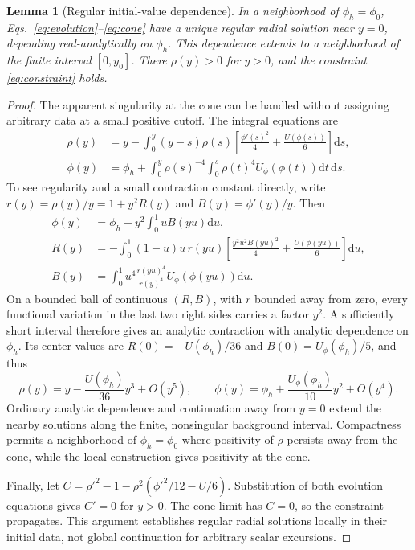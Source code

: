 \documentclass[11pt]{article}
\newtheorem{lemma}{Lemma}
\newcommand{\dd}{\mathrm{d}}
\begin{document}
\begin{lemma}[Regular initial-value dependence]\label{lem:ivp}
In a neighborhood of $\phi_h=\phi_0$, Eqs.~\eqref{eq:evolution}--\eqref{eq:cone} have a unique regular radial solution near $y=0$, depending real-analytically on $\phi_h$. This dependence extends to a neighborhood of the finite interval $[0,y_0]$. There $\rho(y)>0$ for $y>0$, and the constraint \eqref{eq:constraint} holds.
\end{lemma}
\begin{proof}
The apparent singularity at the cone can be handled without assigning arbitrary data at a small positive cutoff. The integral equations are
\begin{align}
\rho(y)&=y-\int_0^y(y-s)\rho(s)
 \left[\frac{\phi'(s)^2}{4}+\frac{U(\phi(s))}{6}\right]\dd s,\label{eq:volterra1}\\
\phi(y)&=\phi_h+\int_0^y\rho(s)^{-4}
 \int_0^s\rho(t)^4U_\phi(\phi(t))\dd t\,\dd s.
\label{eq:volterra2}
\end{align}
To see regularity and a small contraction constant directly, write
$r(y)=\rho(y)/y=1+y^2R(y)$ and $B(y)=\phi'(y)/y$. Then
\begin{align}
\phi(y)&=\phi_h+y^2\int_0^1uB(yu)\dd u,\nonumber\\
R(y)&=-\int_0^1(1-u)u\,r(yu)
\left[\frac{y^2u^2B(yu)^2}{4}+\frac{U(\phi(yu))}{6}\right]\dd u,\nonumber\\
B(y)&=\int_0^1u^4\frac{r(yu)^4}{r(y)^4}U_\phi(\phi(yu))\dd u.
\end{align}
On a bounded ball of continuous $(R,B)$, with $r$ bounded away from zero, every functional variation in the last two right sides carries a factor $y^2$. A sufficiently short interval therefore gives an analytic contraction with analytic dependence on $\phi_h$. Its center values are $R(0)=-U(\phi_h)/36$ and $B(0)=U_\phi(\phi_h)/5$, and thus
\begin{equation}
\rho(y)=y-\frac{U(\phi_h)}{36}y^3+O(y^5),\qquad
\phi(y)=\phi_h+\frac{U_\phi(\phi_h)}{10}y^2+O(y^4).
\end{equation}
Ordinary analytic dependence and continuation away from $y=0$ extend the nearby solutions along the finite, nonsingular background interval. Compactness permits a neighborhood of $\phi_h=\phi_0$ where positivity of $\rho$ persists away from the cone, while the local construction gives positivity at the cone.

Finally, let $C=\rho'^2-1-\rho^2(\phi'^2/12-U/6)$. Substitution of both evolution equations gives $C'=0$ for $y>0$. The cone limit has $C=0$, so the constraint propagates. This argument establishes regular radial solutions locally in their initial data, not global continuation for arbitrary scalar excursions.
\end{proof}
\end{document}
